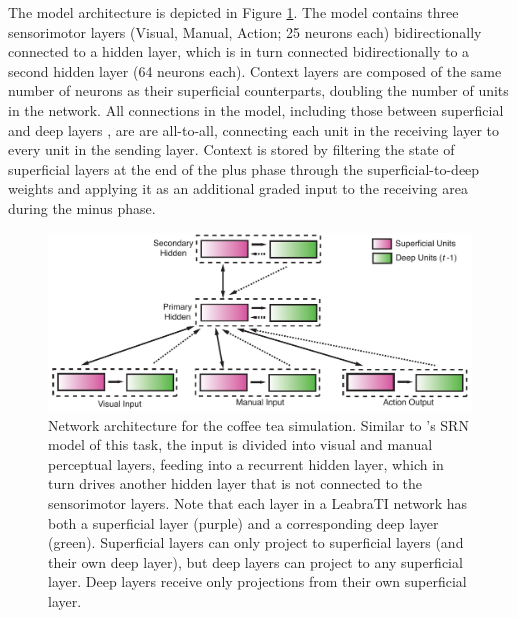 \documentclass[10pt,letterpaper]{article}
\numberwithin{equation}{section}
\begin{document}
The model architecture is depicted in Figure \ref{fig:coffeenet}. The model contains three sensorimotor layers (Visual, Manual, Action; 25 neurons each) bidirectionally connected to a hidden layer, which is in turn connected bidirectionally to a second hidden layer (64 neurons each). Context layers are composed of the same number of neurons as their superficial counterparts, doubling the number of units in the network. All connections in the model, including those between superficial and deep layers , are are all-to-all, connecting each unit in the receiving layer to every unit in the sending layer. Context is stored by filtering the state of superficial layers at the end of the plus phase through the superficial-to-deep weights and applying it as an additional graded input to the receiving area during the minus phase.


\begin{figure}[h]
  \centering
  \includegraphics[width=\textwidth]{coffee_tea_arch}
  \caption{\small{Network architecture for the coffee tea simulation. Similar to \protect{}'s SRN model of this task, the input is divided into visual and manual perceptual layers, feeding into a recurrent hidden layer, which in turn drives another hidden layer that is not connected to the sensorimotor layers. Note that each layer in a LeabraTI network has both a superficial layer (purple) and a corresponding deep layer (green). Superficial layers can only project to superficial layers (and their own deep layer), but deep layers can project to any superficial layer. Deep layers receive only projections from their own superficial layer.}}
  \label{fig:coffeenet}
\end{figure}
\end{document}
